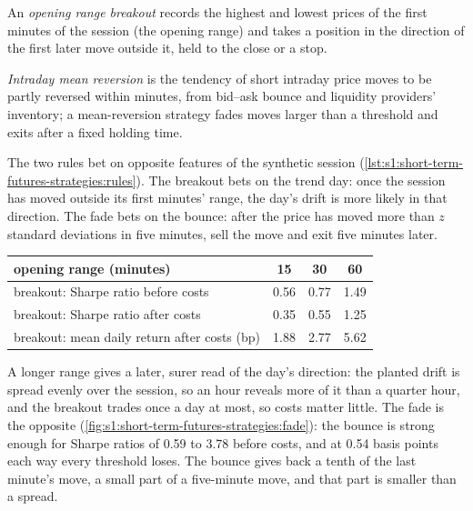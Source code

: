 \begin{definition}\label{def:s1:short-term-futures-strategies:orb}
An \emph{opening range breakout} records the highest and lowest prices of the first minutes of the session (the opening
range) and takes a position in the direction of the first later move outside it, held to the close or a stop.
\end{definition}

\begin{definition}\label{def:s1:short-term-futures-strategies:mr}
\emph{Intraday mean reversion} is the tendency of short intraday price moves to be partly reversed within minutes, from
bid--ask bounce and liquidity providers' inventory; a mean-reversion strategy fades moves larger than a threshold and exits after a fixed holding time.
\end{definition}

The two rules bet on opposite features of the synthetic session (\cref{lst:s1:short-term-futures-strategies:rules}). The breakout bets on the trend day:
once the session has moved outside its first minutes' range, the day's drift is more likely in that direction. The fade bets on the bounce: after the
price has moved more than $z$ standard deviations in five minutes, sell the move and exit five minutes later.

\begin{center}
\small
\begin{tabular}{@{}lccc@{}}
\toprule
opening range (minutes) & 15 & 30 & 60\\
\midrule
breakout: Sharpe ratio before costs & 0.56 & 0.77 & 1.49\\
breakout: Sharpe ratio after costs & 0.35 & 0.55 & 1.25\\
breakout: mean daily return after costs (bp) & 1.88 & 2.77 & 5.62\\
\bottomrule
\end{tabular}
\end{center}

A longer range gives a later, surer read of the day's direction: the planted drift is spread evenly over the session, so an hour reveals more of it
than a quarter hour, and the breakout trades once a day at most, so costs matter little. The fade is the opposite (\cref{fig:s1:short-term-futures-strategies:fade}):
the bounce is strong enough for Sharpe ratios of 0.59 to 3.78 before costs, and at 0.54 basis points each way every threshold loses. The bounce gives
back a tenth of the last minute's move, a small part of a five-minute move, and that part is smaller than a spread.

